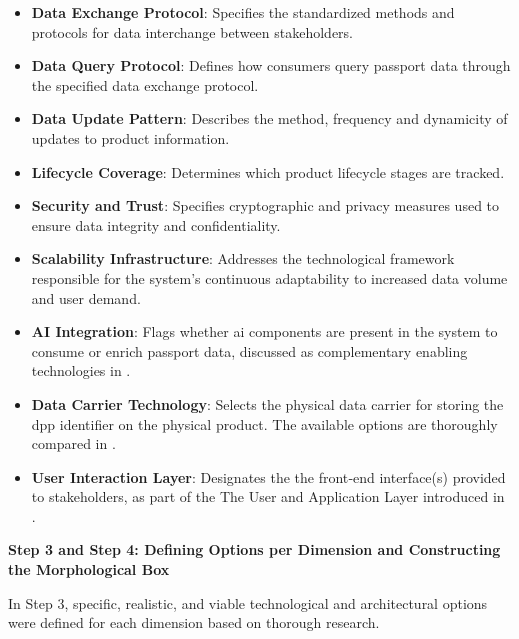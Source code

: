 \begin{itemize}
    \item \textbf{Data Exchange Protocol}: Specifies the standardized methods and protocols for data interchange between stakeholders.

    \item \textbf{Data Query Protocol}: Defines how consumers query passport data through the specified data exchange protocol.

    \item \textbf{Data Update Pattern}: Describes the method, frequency and dynamicity of updates to product information.

    \item \textbf{Lifecycle Coverage}: Determines which product lifecycle stages are tracked.

    \item \textbf{Security and Trust}: Specifies cryptographic and privacy measures used to ensure data integrity and confidentiality.

    \item \textbf{Scalability Infrastructure}: Addresses the technological framework responsible for the system’s continuous adaptability to increased data volume and user demand.
    
    \item \textbf{AI Integration}: Flags whether \ac{ai} components are present in the system to consume or enrich passport data, discussed as complementary enabling technologies in .

    \item \textbf{Data Carrier Technology}: Selects the physical data carrier for storing the \ac{dpp} identifier on the physical product. The available options are thoroughly compared in .

    \item \textbf{User Interaction Layer}: Designates the the front‑end interface(s) provided to stakeholders, as part of the The User and Application Layer introduced in .
\end{itemize}

\textbf{Step 3 and Step 4: Defining Options per Dimension and Constructing the Morphological Box}

In Step 3, specific, realistic, and viable technological and architectural options were defined for each dimension based on thorough research. 

